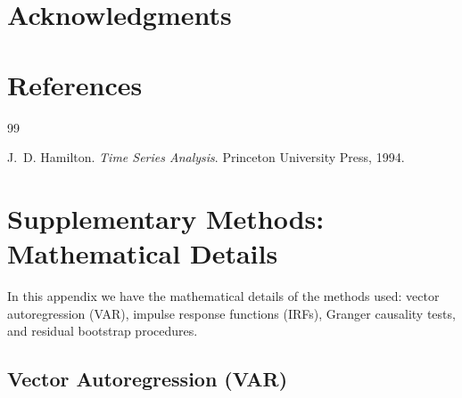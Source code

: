 \documentclass[11pt]{article}
\begin{document}

\section*{Acknowledgments}

\section*{References}

%   
%   

\begin{thebibliography}{99}

J.~D. Hamilton.
\newblock \emph{Time Series Analysis}.
\newblock Princeton University Press, 1994.


\end{thebibliography}

\newpage

\appendix

\section{Supplementary Methods: Mathematical Details}
\label{app:math}

In this appendix we have the mathematical details of the methods used:
vector autoregression (VAR), impulse response functions (IRFs), Granger
causality tests, and residual bootstrap procedures.

\subsection{Vector Autoregression (VAR)}
\label{app:var}
\end{document}
